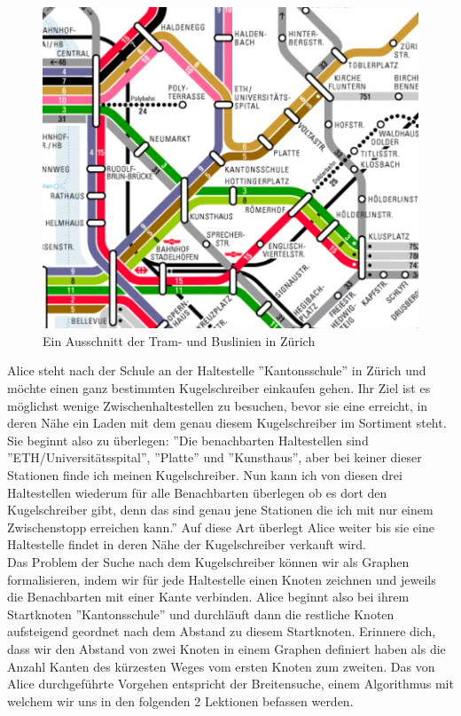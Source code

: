 \begin{figure}[h]
    \centering
    \includegraphics[width=\linewidth]{Pictures/Tram1.PNG}
    \caption{Ein Ausschnitt der Tram- und Buslinien in Zürich}
\end{figure}

Alice steht nach der Schule an der Haltestelle ''Kantonsschule'' in Zürich und möchte einen ganz bestimmten Kugelschreiber einkaufen gehen. Ihr Ziel ist es möglichst wenige Zwischenhaltestellen zu besuchen, bevor sie eine erreicht, in deren Nähe ein Laden mit dem genau diesem Kugelschreiber im Sortiment steht. Sie beginnt also zu überlegen: ''Die benachbarten Haltestellen sind\\ ''ETH/Universitätsspital'', ''Platte'' und ''Kunsthaus'', aber bei keiner dieser Stationen finde ich meinen Kugelschreiber. Nun kann ich von diesen drei Haltestellen wiederum für alle Benachbarten überlegen ob es dort den Kugelschreiber gibt, denn das sind genau jene Stationen die ich mit nur einem Zwischenstopp erreichen kann.'' Auf diese Art überlegt Alice weiter bis sie eine Haltestelle findet in deren Nähe der Kugelschreiber verkauft wird. \\

Das Problem der Suche nach dem Kugelschreiber können wir als Graphen formalisieren, indem wir für jede Haltestelle einen Knoten zeichnen und jeweils die Benachbarten mit einer Kante verbinden. Alice beginnt also bei ihrem Startknoten ''Kantonsschule'' und durchläuft dann die restliche Knoten aufsteigend geordnet nach dem Abstand zu diesem Startknoten. Erinnere dich, dass wir den Abstand von zwei Knoten in einem Graphen definiert haben als die Anzahl Kanten des kürzesten Weges vom ersten Knoten zum zweiten. Das von Alice durchgeführte Vorgehen entspricht der Breitensuche, einem Algorithmus mit welchem wir uns in den folgenden 2 Lektionen befassen werden.\\


